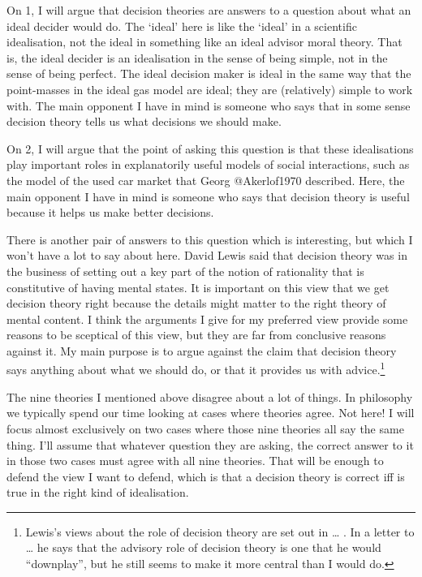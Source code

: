 \documentclass[
  letterpaper,
  DIV=11,
  numbers=noendperiod]{scrartcl}
\begin{document}
On 1, I will argue that decision theories are answers to a question
about what an ideal decider would do. The `ideal' here is like the
`ideal' in a scientific idealisation, not the ideal in something like an
ideal advisor moral theory. That is, the ideal decider is an
idealisation in the sense of being simple, not in the sense of being
perfect. The ideal decision maker is ideal in the same way that the
point-masses in the ideal gas model are ideal; they are (relatively)
simple to work with. The main opponent I have in mind is someone who
says that in some sense decision theory tells us what decisions we
should make.

On 2, I will argue that the point of asking this question is that these
idealisations play important roles in explanatorily useful models of
social interactions, such as the model of the used car market that Georg
@Akerlof1970 described. Here, the main opponent I have in mind is
someone who says that decision theory is useful because it helps us make
better decisions.

There is another pair of answers to this question which is interesting,
but which I won't have a lot to say about here. David Lewis said that
decision theory was in the business of setting out a key part of the
notion of rationality that is constitutive of having mental states. It
is important on this view that we get decision theory right because the
details might matter to the right theory of mental content. I think the
arguments I give for my preferred view provide some reasons to be
sceptical of this view, but they are far from conclusive reasons against
it. My main purpose is to argue against the claim that decision theory
says anything about what we should do, or that it provides us with
advice.\footnote{Lewis's views about the role of decision theory are set
  out in \ldots{} . In a letter to \ldots{} he says that the advisory
  role of decision theory is one that he would ``downplay'', but he
  still seems to make it more central than I would do.}

The nine theories I mentioned above disagree about a lot of things. In
philosophy we typically spend our time looking at cases where theories
agree. Not here! I will focus almost exclusively on two cases where
those nine theories all say the same thing. I'll assume that whatever
question they are asking, the correct answer to it in those two cases
must agree with all nine theories. That will be enough to defend the
view I want to defend, which is that a decision theory is correct iff is
true in the right kind of idealisation.
\end{document}
